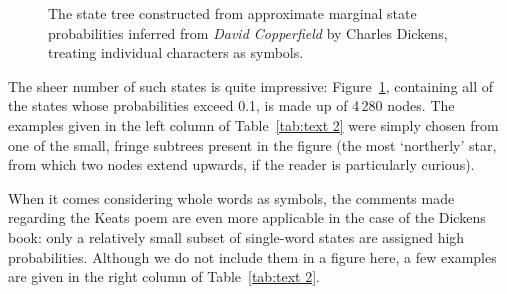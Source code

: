\documentclass[11pt,a4paper]{article}
\begin{document}
%
\begin{figure}[htbp]
\centering
\caption{The state tree constructed from approximate marginal state
  probabilities inferred from \textit{David Copperfield} by Charles Dickens,
  treating individual characters as symbols.}
\label{fig:text 2c}
\end{figure}

The sheer number of such states is quite impressive: Figure~\ref{fig:text 2c},
containing all of the states whose probabilities exceed 0.1, is made up of
4\,280 nodes. The examples given in the left column of Table~\ref{tab:text 2}
were simply chosen from one of the small, fringe subtrees present in the figure
(the most `northerly' star, from which two nodes extend upwards, if the reader
is particularly curious).

When it comes considering whole words as symbols, the comments made regarding
the Keats poem are even more applicable in the case of the Dickens book: only a
relatively small subset of single-word states are assigned high probabilities.
Although we do not include them in a figure here, a few examples are given in
the right column of Table~\ref{tab:text 2}.
\end{document}
